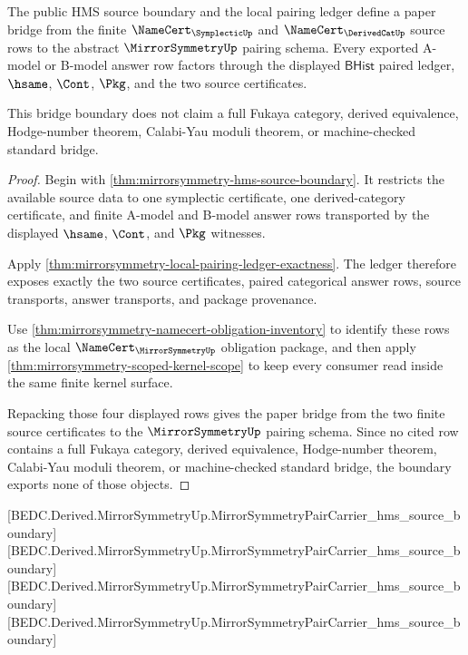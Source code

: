 \begin{theorem}
\label{thm:mirrorsymmetry-finite-hms-bridge-boundary}
The public HMS source boundary and the local pairing ledger define a paper
bridge from the finite $\NameCert_{\SymplecticUp}$ and
$\NameCert_{\DerivedCatUp}$ source rows to the abstract
$\MirrorSymmetryUp$ pairing schema. Every exported A-model or B-model answer
row factors through the displayed $\mathsf{BHist}$ paired ledger, $\hsame$,
$\Cont$, $\Pkg$, and the two source certificates.

This bridge boundary does not claim a full Fukaya category, derived
equivalence, Hodge-number theorem, Calabi-Yau moduli theorem, or
machine-checked standard bridge.
\end{theorem}
\begin{proof}
Begin with \autoref{thm:mirrorsymmetry-hms-source-boundary}. It restricts the
available source data to one symplectic certificate, one derived-category
certificate, and finite A-model and B-model answer rows transported by the
displayed $\hsame$, $\Cont$, and $\Pkg$ witnesses.

Apply \autoref{thm:mirrorsymmetry-local-pairing-ledger-exactness}. The ledger
therefore exposes exactly the two source certificates, paired categorical
answer rows, source transports, answer transports, and package provenance.

Use \autoref{thm:mirrorsymmetry-namecert-obligation-inventory} to identify
these rows as the local $\NameCert_{\MirrorSymmetryUp}$ obligation package,
and then apply \autoref{thm:mirrorsymmetry-scoped-kernel-scope} to keep every
consumer read inside the same finite kernel surface.

Repacking those four displayed rows gives the paper bridge from the two
finite source certificates to the $\MirrorSymmetryUp$ pairing schema. Since no
cited row contains a full Fukaya category, derived equivalence, Hodge-number
theorem, Calabi-Yau moduli theorem, or machine-checked standard bridge, the
boundary exports none of those objects.
\end{proof}

[BEDC.Derived.MirrorSymmetryUp.MirrorSymmetryPairCarrier\_hms\_source\_boundary]
[BEDC.Derived.MirrorSymmetryUp.MirrorSymmetryPairCarrier\_hms\_source\_boundary]
[BEDC.Derived.MirrorSymmetryUp.MirrorSymmetryPairCarrier\_hms\_source\_boundary]
[BEDC.Derived.MirrorSymmetryUp.MirrorSymmetryPairCarrier\_hms\_source\_boundary]


